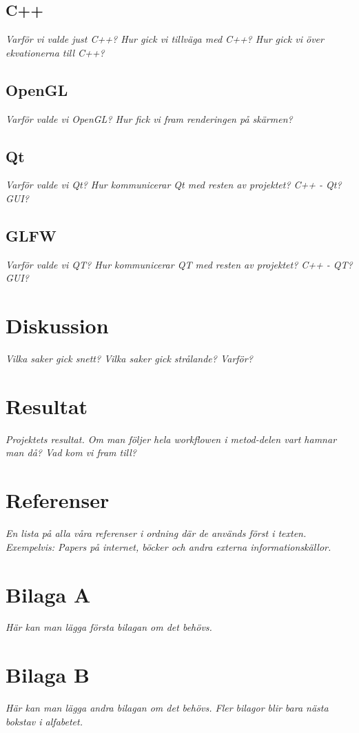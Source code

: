 \documentclass[a4paper,12pt,twoside,swedish]{report}
\begin{document}
\subsection{C++}
\textit{Varför vi valde just C++? Hur gick vi tillväga med C++? Hur gick vi över ekvationerna till C++?}

\subsection{OpenGL}
\textit{Varför valde vi OpenGL? Hur fick vi fram renderingen på skärmen?}

\subsection{Qt}
\textit{Varför valde vi Qt? Hur kommunicerar Qt med resten av projektet? C++ - Qt? GUI?}

\subsection{GLFW}
\textit{Varför valde vi QT? Hur kommunicerar QT med resten av projektet? C++ - QT? GUI?}

\section{Diskussion}
\textit{Vilka saker gick snett? Vilka saker gick strålande? Varför?}

\section{Resultat}
\textit{Projektets resultat. Om man följer hela workflowen i metod-delen vart hamnar man då? Vad kom vi fram till?}

\section{Referenser}
\textit{En lista på alla våra referenser i ordning där de används först i texten. Exempelvis: Papers på internet, böcker och andra externa informationskällor.}

\section{Bilaga A}
\textit{Här kan man lägga första bilagan om det behövs.}

\section{Bilaga B}
\textit{Här kan man lägga andra bilagan om det behövs. Fler bilagor blir bara nästa bokstav i alfabetet.}
\end{document}
